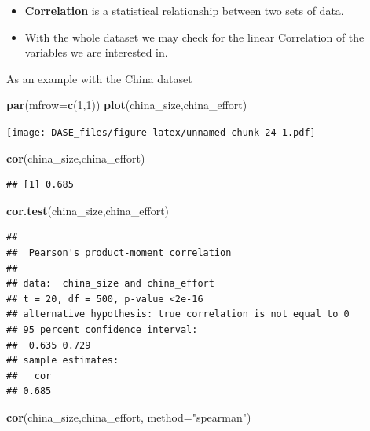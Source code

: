 \documentclass[]{book}
\newenvironment{Shaded}{\begin{snugshade}}{\end{snugshade}}
\newcommand{\KeywordTok}[1]{\textcolor[rgb]{0.13,0.29,0.53}{\textbf{{#1}}}}
\newcommand{\DataTypeTok}[1]{\textcolor[rgb]{0.13,0.29,0.53}{{#1}}}
\newcommand{\DecValTok}[1]{\textcolor[rgb]{0.00,0.00,0.81}{{#1}}}
\newcommand{\StringTok}[1]{\textcolor[rgb]{0.31,0.60,0.02}{{#1}}}
\newcommand{\NormalTok}[1]{{#1}}
\providecommand{\tightlist}{%
  \setlength{\itemsep}{0pt}\setlength{\parskip}{0pt}}
\begin{document}
\begin{itemize}
\tightlist
\item
  \textbf{Correlation} is a statistical relationship between two sets of
  data.
\item
  With the whole dataset we may check for the linear Correlation of the
  variables we are interested in.
\end{itemize}

As an example with the China dataset

\begin{Shaded}
\begin{Highlighting}[]
\KeywordTok{par}\NormalTok{(}\DataTypeTok{mfrow=}\KeywordTok{c}\NormalTok{(}\DecValTok{1}\NormalTok{,}\DecValTok{1}\NormalTok{))}
\KeywordTok{plot}\NormalTok{(china_size,china_effort)}
\end{Highlighting}
\end{Shaded}

\texttt{[image: DASE\_files/figure-latex/unnamed-chunk-24-1.pdf]}

\begin{Shaded}
\begin{Highlighting}[]
\KeywordTok{cor}\NormalTok{(china_size,china_effort)}
\end{Highlighting}
\end{Shaded}

\begin{verbatim}
## [1] 0.685
\end{verbatim}

\begin{Shaded}
\begin{Highlighting}[]
\KeywordTok{cor.test}\NormalTok{(china_size,china_effort)}
\end{Highlighting}
\end{Shaded}

\begin{verbatim}
## 
##  Pearson's product-moment correlation
## 
## data:  china_size and china_effort
## t = 20, df = 500, p-value <2e-16
## alternative hypothesis: true correlation is not equal to 0
## 95 percent confidence interval:
##  0.635 0.729
## sample estimates:
##   cor 
## 0.685
\end{verbatim}

\begin{Shaded}
\begin{Highlighting}[]
\KeywordTok{cor}\NormalTok{(china_size,china_effort, }\DataTypeTok{method=}\StringTok{"spearman"}\NormalTok{)}
\end{Highlighting}
\end{Shaded}
\end{document}
